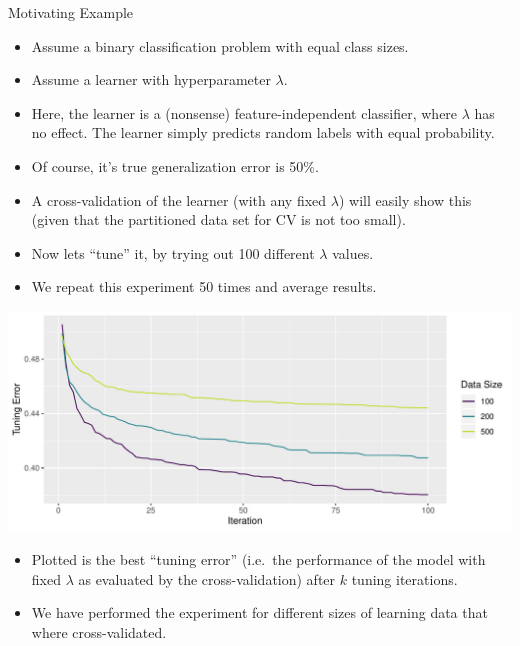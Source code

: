     \begin{frame}[c,allowframebreaks]{Motivating Example}
    \begin{itemize}
        \item Assume a binary classification problem with equal class sizes.
        \item Assume a learner with hyperparameter $\lambda$.
        \item Here, the learner is a (nonsense) feature-independent classifier,
              where $\lambda$ has no effect. The learner simply
              predicts random labels with equal probability.
        \item Of course, it's true generalization error is 50\%.
        \item A cross-validation of the learner (with any fixed $\lambda$) will easily show this
          (given that the partitioned data set for CV is not too small).
        \item Now lets \enquote{tune} it, by trying out 100 different $\lambda$ values.
        \item We repeat this experiment 50 times and average results.
    \end{itemize}

    \framebreak

    \begin{center}
        \includegraphics[height=.5\textheight]{example-nested-resampling}
    \end{center}

    \begin{itemize}
    \item Plotted is the best \enquote{tuning error} (i.e.\ the performance of the model with fixed $\lambda$ as evaluated by the cross-validation) after $k$ tuning iterations.
    \item We have performed the experiment for different sizes of learning data
          that where cross-validated.
    \end{itemize}


\end{frame}
